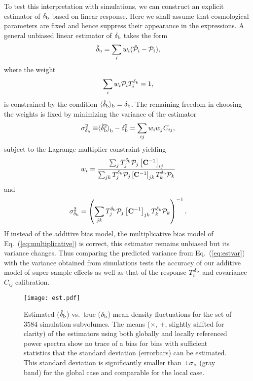 \documentclass[prd,twocolumn,amsmath,amssymb,floatfix,superscriptaddress]{revtex4-1}
\newcommand{\br}{{\rm b}}
\newcommand{\Dv}{{\cal P}}
\begin{document}
{To test this interpretation with simulations, we can construct an explicit estimator of $\delta_\br$ based on  linear response.
Here
we shall assume that cosmological parameters are fixed and hence suppress their
appearance in the expressions.
A general  unbiased linear estimator {of $\delta_\br$} takes the form
%
\begin{equation}
    \hat\delta_\br = \sum_i w_i (\hat \Dv_i - \Dv_i),
    \label{eq:est1}
\end{equation}
%
where the weight 
\begin{equation}
\sum_i w_i \Dv_i T_i^{\delta_\br} = 1,
\end{equation}
is constrained by the condition 
$\langle {\hat\delta_\br} \rangle_\br = \delta_\br$.   The remaining freedom in choosing the
weights is fixed by minimizing the variance of the estimator 
%
\begin{equation}
   {\sigma_{\delta_\br}^2 \equiv}
{\langle \hat \delta_\br^2 \rangle}_\br -\delta_\br^2
    =  \sum_{ij} w_i w_j C_{ij},
    \label{eq:estvar}
\end{equation}
%
subject to the Lagrange multiplier constraint yielding
\begin{equation}
    w_i = \frac{\sum_{j} T_j^{\delta_\br} \Dv_j \left[{\bf C}^{-1}\right]_{ij}}
        {\sum_{jk} T_j^{\delta_\br}\Dv_j \left[{\bf C}^{-1}\right]_{jk} T_k^{\delta_\br} \Dv_k}
    \label{eq:w1}
\end{equation}
and
\begin{equation}
\sigma_{\delta_\br}^2
= \left( \sum_{jk} T_j^{\delta_\br}\Dv_j \left[{\bf C}^{-1}\right]_{jk} T_k^{\delta_\br} \Dv_k \right)^{-1}.
\label{eq:bvar}
\end{equation}
If instead of the additive bias model, the multiplicative bias model of  Eq.~(\ref{eq:multiplicative}) is correct, this estimator remains unbiased but its variance changes.  
Thus comparing the predicted variance from Eq.~(\ref{eq:estvar}) with the variance
obtained from simulations tests the accuracy of our additive model of
super-sample effects as well as 
that of the response $T^{\delta_\br}_i$ and covariance $C_{ij}$ calibration.


\begin{figure}[tb]
\centering
    \texttt{[image: est.pdf]}
    \caption{
Estimated ($\hat\delta_\br$) vs.\ true ($\delta_\br$) mean density 
{fluctuations}
    for the set of $3584$ 
simulation subvolumes.  
        The means ($\times$, $+$, slightly shifted for clarity) of the estimators using both globally and locally referenced power spectra
        show no trace of {a}
bias 
        for bins with sufficient statistics that the standard deviation
        (errorbars)  can be estimated.  
This standard deviation is
        significantly smaller than  $\pm\sigma_\br$ (gray band)  for the global case
        and comparable for the local case.  
    }
    \label{fig:sss}
\end{figure}


}
\end{document}
